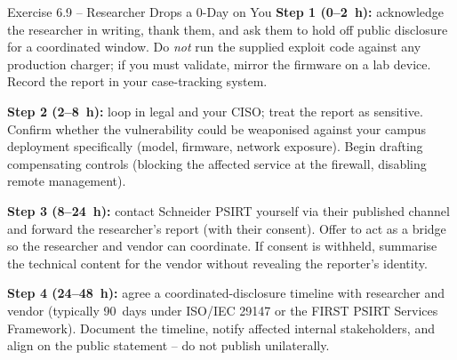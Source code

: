 \documentclass[11pt,a4paper]{article}
\begin{document}
\begin{taskbox}{Exercise 6.9 -- Researcher Drops a 0-Day on You}
\textbf{Step 1 (0--2~h):} acknowledge the researcher in writing,
thank them, and ask them to hold off public disclosure for a
coordinated window. Do \emph{not} run the supplied exploit code
against any production charger; if you must validate, mirror the
firmware on a lab device. Record the report in your case-tracking
system.

\textbf{Step 2 (2--8~h):} loop in legal and your CISO; treat the
report as sensitive. Confirm whether the vulnerability could be
weaponised against your campus deployment specifically (model,
firmware, network exposure). Begin drafting compensating controls
(blocking the affected service at the firewall, disabling remote
management).

\textbf{Step 3 (8--24~h):} contact Schneider PSIRT yourself via
their published channel and forward the researcher's report (with
their consent). Offer to act as a bridge so the researcher and
vendor can coordinate. If consent is withheld, summarise the
technical content for the vendor without revealing the reporter's
identity.

\textbf{Step 4 (24--48~h):} agree a coordinated-disclosure timeline
with researcher and vendor (typically 90~days under ISO/IEC 29147
or the FIRST PSIRT Services Framework). Document the timeline,
notify affected internal stakeholders, and align on the public
statement -- do not publish unilaterally.
\end{taskbox}
\end{document}

